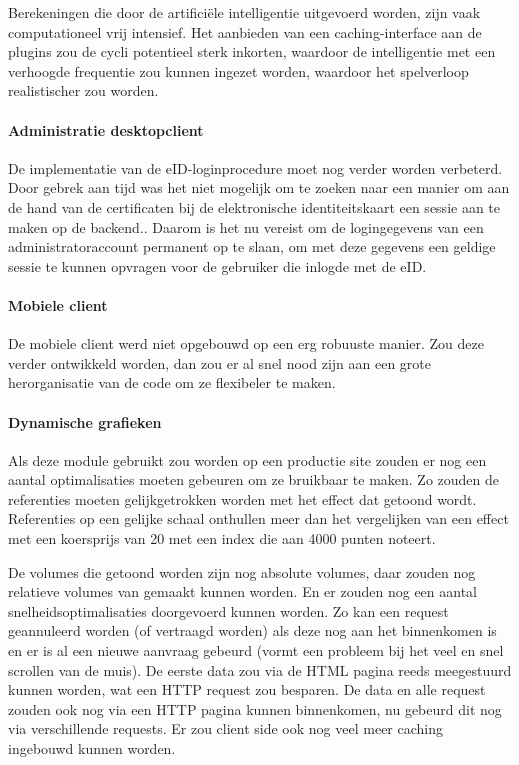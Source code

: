 Berekeningen die door de artifici\"ele intelligentie uitgevoerd worden, zijn vaak computationeel vrij intensief. Het aanbieden van een caching-interface aan de plugins zou de cycli potentieel sterk inkorten, waardoor de intelligentie met een verhoogde frequentie zou kunnen ingezet worden, waardoor het spelverloop realistischer zou worden.

\paragraph{Administratie desktopclient} De implementatie van de eID-loginprocedure moet nog verder worden verbeterd.  Door gebrek aan tijd was het niet mogelijk om te zoeken naar een manier om aan de hand van de certificaten bij de elektronische identiteitskaart een sessie aan te maken op de backend.. Daarom is het nu vereist om de logingegevens van een administratoraccount permanent op te slaan, om met deze gegevens een geldige sessie te kunnen opvragen voor de gebruiker die inlogde met de eID.

\paragraph{Mobiele client} De mobiele client werd niet opgebouwd op een erg robuuste manier. Zou deze verder ontwikkeld worden, dan zou er al snel nood zijn aan een grote herorganisatie van de code om ze flexibeler te maken.

\paragraph{Dynamische grafieken} Als deze module gebruikt zou worden op een productie site zouden er nog een aantal optimalisaties moeten gebeuren om ze bruikbaar te maken. Zo zouden de referenties moeten gelijkgetrokken worden met het effect dat getoond wordt. Referenties op een gelijke schaal onthullen meer dan het vergelijken van een effect met een koersprijs van 20 met een index die aan 4000 punten noteert.

De volumes die getoond worden zijn nog absolute volumes, daar zouden nog relatieve volumes van gemaakt kunnen worden. En er zouden nog een aantal snelheidsoptimalisaties doorgevoerd kunnen worden. Zo kan een request geannuleerd worden (of vertraagd worden) als deze nog aan het binnenkomen is en er is al een nieuwe aanvraag gebeurd (vormt een probleem bij het veel en snel scrollen van de muis). De eerste data zou via de HTML pagina reeds meegestuurd kunnen worden, wat een HTTP request zou besparen. De data en alle request zouden ook nog via een HTTP pagina kunnen binnenkomen, nu gebeurd dit nog via verschillende requests.
Er zou client side ook nog veel meer caching ingebouwd kunnen worden.


